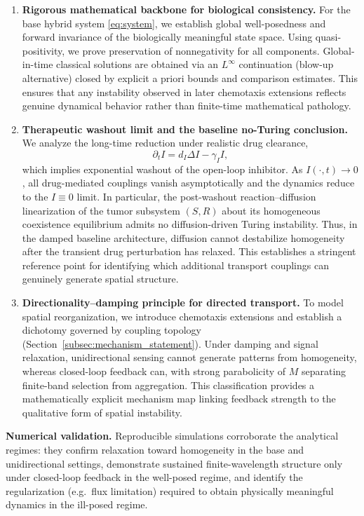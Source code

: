 \documentclass[pdflatex,sn-mathphys-ay]{sn-jnl}
\theoremstyle{thmstyleone}
\theoremstyle{definition}
\theoremstyle{remark}
\begin{document}
\begin{enumerate}[label=(R\arabic*)]
\item \textbf{Rigorous mathematical backbone for biological consistency.}
For the base hybrid system \eqref{eq:system}, we establish global well-posedness and forward invariance of the biologically meaningful state space. 
Using quasi-positivity, we prove preservation of nonnegativity for all components. 
Global-in-time classical solutions are obtained via an $L^\infty$ continuation (blow-up alternative) closed by explicit a priori bounds and comparison estimates. 
This ensures that any instability observed in later chemotaxis extensions reflects genuine dynamical behavior rather than finite-time mathematical pathology.

\item \textbf{Therapeutic washout limit and the baseline no-Turing conclusion.}
We analyze the long-time reduction under realistic drug clearance,
\[
\partial_t I=d_I\Delta I-\gamma_I I,
\]
which implies exponential washout of the open-loop inhibitor. 
As $I(\cdot,t)\to 0$, all drug-mediated couplings vanish asymptotically and the dynamics reduce to the $I\equiv 0$ limit. 
In particular, the post-washout reaction--diffusion linearization of the tumor subsystem $(S,R)$ about its homogeneous coexistence equilibrium admits no diffusion-driven Turing instability. 
Thus, in the damped baseline architecture, diffusion cannot destabilize homogeneity after the transient drug perturbation has relaxed. 
This establishes a stringent reference point for identifying which additional transport couplings can genuinely generate spatial structure.

\item \textbf{Directionality--damping principle for directed transport.}
To model spatial reorganization, we introduce chemotaxis extensions and establish a dichotomy governed by coupling topology (Section~\ref{subsec:mechanism_statement}). 
Under damping and signal relaxation, unidirectional sensing cannot generate patterns from homogeneity, whereas closed-loop feedback can, with strong parabolicity of $M$ separating finite-band selection from aggregation.
This classification provides a mathematically explicit mechanism map linking feedback strength to the qualitative form of spatial instability.
\end{enumerate}

\medskip
\noindent\textbf{Numerical validation.}
Reproducible simulations corroborate the analytical regimes: they confirm relaxation toward homogeneity in the base and unidirectional settings, demonstrate sustained finite-wavelength structure only under closed-loop feedback in the well-posed regime, and identify the regularization (e.g.\ flux limitation) required to obtain physically meaningful dynamics in the ill-posed regime.
\end{document}
